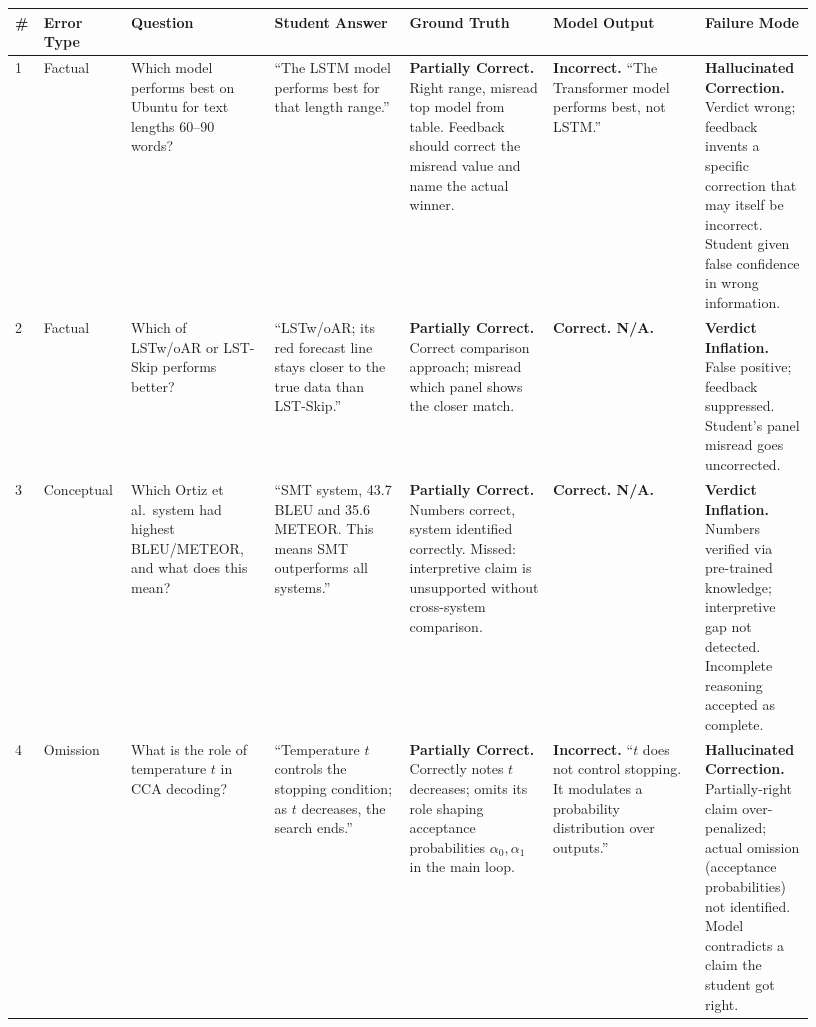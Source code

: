 \documentclass{article}
\begin{document}
\begin{table}[!ht]
\centering
\scriptsize
\setlength{\tabcolsep}{3pt}
\begin{tabular}{@{}p{0.03\linewidth}p{0.09\linewidth}p{0.17\linewidth}p{0.16\linewidth}p{0.17\linewidth}p{0.18\linewidth}p{0.13\linewidth}@{}}
\toprule
\# & Error Type & Question & Student Answer & Ground Truth & Model Output & Failure Mode \\
\midrule
1 &
Factual &
Which model performs best on Ubuntu for text lengths 60--90 words? &
``The LSTM model performs best for that length range.'' &
\textbf{Partially Correct.} Right range, misread top model from table. Feedback should correct the misread value and name the actual winner. &
\textbf{Incorrect.} ``The Transformer model performs best, not LSTM.'' &
\textbf{Hallucinated Correction.} Verdict wrong; feedback invents a specific correction that may itself be incorrect. Student given false confidence in wrong information. \\
\midrule
2 &
Factual &
Which of LSTw/oAR or LST-Skip performs better? &
``LSTw/oAR; its red forecast line stays closer to the true data than LST-Skip.'' &
\textbf{Partially Correct.} Correct comparison approach; misread which panel shows the closer match. &
\textbf{Correct. N/A.} &
\textbf{Verdict Inflation.} False positive; feedback suppressed. Student's panel misread goes uncorrected. \\
\midrule
3 &
Conceptual &
Which Ortiz et al.\ system had highest BLEU/METEOR, and what does this mean? &
``SMT system, 43.7 BLEU and 35.6 METEOR. This means SMT outperforms all systems.'' &
\textbf{Partially Correct.} Numbers correct, system identified correctly. Missed: interpretive claim is unsupported without cross-system comparison. &
\textbf{Correct. N/A.} &
\textbf{Verdict Inflation.} Numbers verified via pre-trained knowledge; interpretive gap not detected. Incomplete reasoning accepted as complete. \\
\midrule
4 &
Omission &
What is the role of temperature $t$ in CCA decoding? &
``Temperature $t$ controls the stopping condition; as $t$ decreases, the search ends.'' &
\textbf{Partially Correct.} Correctly notes $t$ decreases; omits its role shaping acceptance probabilities $\alpha_0, \alpha_1$ in the main loop. &
\textbf{Incorrect.} ``$t$ does not control stopping. It modulates a probability distribution over outputs.'' &
\textbf{Hallucinated Correction.} Partially-right claim over-penalized; actual omission (acceptance probabilities) not identified. Model contradicts a claim the student got right. \\

\end{tabular}
\end{table}
\end{document}
